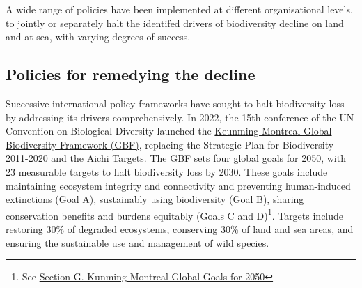 	A wide range of policies have been implemented at different organisational levels, to jointly or separately halt the identifed drivers of biodiversity decline on land and at sea, with varying degrees of success. 




\subsection*{Policies for remedying the decline}
\par

Successive international policy frameworks have sought to halt biodiversity loss by addressing its drivers comprehensively. In 2022, the 15th conference of the UN Convention on Biological Diversity launched the \href{https://www.cbd.int/doc/c/e6d3/cd1d/daf663719a03902a9b116c34/cop-15-l-25-en.pdf}{Keunming Montreal Global Biodiversity Framework (GBF)}, replacing the Strategic Plan for Biodiversity 2011-2020 and the Aichi Targets. The GBF sets four global goals for 2050, with 23 measurable targets to halt biodiversity loss by 2030. These goals include maintaining ecosystem integrity and connectivity and preventing human-induced extinctions (Goal A), sustainably using biodiversity (Goal B), sharing conservation benefits and burdens equitably (Goals C and D)\footnote{See \href{https://www.cbd.int/doc/c/e6d3/cd1d/daf663719a03902a9b116c34/cop-15-l-25-en.pdf}{Section G. Kunming-Montreal Global Goals for 2050}}. \href{https://www.cbd.int/gbf/targets/5}{Targets} include restoring 30\% of degraded ecosystems, conserving 30\% of land and sea areas, and ensuring the sustainable use and management of wild species.





